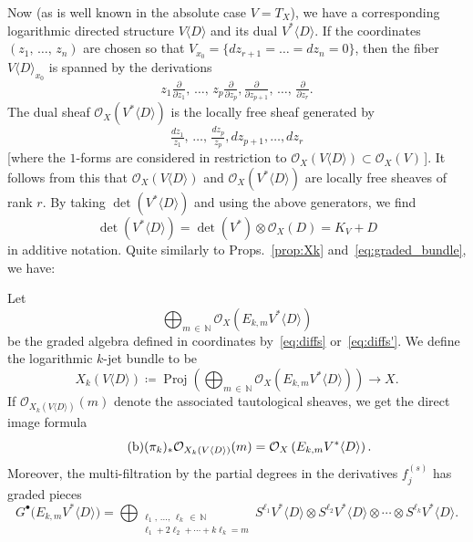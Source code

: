 \documentclass[AHL,Unicode,longabstracts,published]{cedram}
\DeclareMathOperator{\Proj}{Proj}
\newcommand*\cO{\mathcal{O}}
\newcommand*\bN{\mathbb{N}}
\newcommand*\bydef{\coloneqq}
\begin{document}
Now (as is well known in the absolute case $V=T_X$), we have a corresponding logarithmic directed structure
$V\langle D\rangle$ and its dual $V^*\langle D\rangle$. If the coordinates $(z_1,\,\dotsc,\,z_n)$ are chosen so that $V_{x_0}=\{dz_{r+1}=\ldots=dz_n=0\}$, then the fiber $V\langle D\rangle_{x_0}$ is spanned by the derivations
\[
z_1\tfrac{\partial}{\partial z_1},\,\dotsc,\,z_p\tfrac{\partial}{\partial z_p},
\tfrac{\partial}{\partial z_{p+1}},\,\dotsc,\,\tfrac{\partial}{\partial z_r}.
\]
The dual sheaf $\cO_X(V^*\langle D\rangle)$ is the locally free sheaf generated by
\[
\tfrac{dz_1}{ z_1},\,\dotsc,\,\tfrac{dz_p}{ z_p}, dz_{p+1},\dotsc,dz_r
\]
[where the $1$-forms are considered in restriction to
$\cO_X(V\langle D\rangle)\subset\cO_X(V)\,$]. It follows from this that $\cO_X(V\langle D\rangle)$ and
$\cO_X(V^*\langle D\rangle)$ are locally free sheaves of rank $r$. By taking $\det(V^*\langle D\rangle)$ and using the above generators, we find
\[
\det\left(V^*\langle D\rangle\right)=\det(V^*)\otimes\cO_X(D)=K_V+ D
\]
in additive notation. Quite similarly to Props.~\ref{prop:Xk} and~\ref{eq:graded_bundle}, we have:
\begin{prop}\label{prop2.4}
Let
\[
\bigoplus_{m\,\in\,\bN}\cO_X\left(E_{k,m}V^*\langle D\rangle\right)
\]
be the graded algebra defined in coordinates by~\eqref{eq:diffs} or~\eqref{eq:diffs'}. We define the logarithmic $k$-jet bundle to be
\begin{equation}\label{prop2.4.a}
\tag{a} X_k(V\langle D\rangle)
\bydef
\Proj\left(\bigoplus_{m\,\in\,\bN}\cO_X(E_{k,m}V^*\langle D\rangle)\right)\to X.
\end{equation}
If $\cO_{X_k(V\langle D\rangle)}(m)$ denote the associated tautological sheaves, we get the direct image formula
\begin{equation}\label{prop2.4.b}
\tag{b} (\pi_k)_*\smash{\cO_{X_k(V\langle D\rangle)}(m)}=\cO_X\left(E_{k,m} V^*
\langle D\rangle\right).
\end{equation}
Moreover, the multi-filtration by the partial degrees in the derivatives
$f_j^{(s)}$ has graded pieces
\begin{equation}\label{prop2.4.c}
\tag{c} G^\bullet\big(E_{k,m}V^*\langle D\rangle\big) =
\bigoplus_{\substack{\ell_1,\,\dotsc,\,\ell_k\,\in\,\bN\\\ell_1+2\ell_2+\cdots+k\ell_k=m}} S^{\ell_1}V^*\langle D\rangle\otimes S^{\ell_2}V^*\langle D\rangle\otimes\cdots\otimes S^{\ell_k}V^*\langle D\rangle.
\end{equation}
\end{prop}
\end{document}
